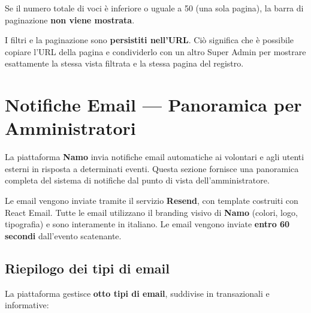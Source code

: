 \documentclass[a4paper,11pt,oneside]{book}
\newcommand{\namo}{\textbf{Namo}}
\begin{document}
Se il numero totale di voci \`e inferiore o uguale a 50 (una sola pagina), la barra di paginazione \textbf{non viene mostrata}.

\begin{tipbox}
I filtri e la paginazione sono \textbf{persistiti nell'URL}. Ci\`o significa che \`e possibile copiare l'URL della pagina e condividerlo con un altro Super Admin per mostrare esattamente la stessa vista filtrata e la stessa pagina del registro.
\end{tipbox}

\section{Notifiche Email --- Panoramica per Amministratori}
\label{sec:notifiche-panoramica}

La piattaforma \namo{} invia notifiche email automatiche ai volontari e agli utenti esterni in risposta a determinati eventi. Questa sezione fornisce una panoramica completa del sistema di notifiche dal punto di vista dell'amministratore.

\begin{infobox}
Le email vengono inviate tramite il servizio \textbf{Resend}, con template costruiti con React Email. Tutte le email utilizzano il branding visivo di \namo{} (colori, logo, tipografia) e sono interamente in italiano. Le email vengono inviate \textbf{entro 60 secondi} dall'evento scatenante.
\end{infobox}

\subsection{Riepilogo dei tipi di email}

La piattaforma gestisce \textbf{otto tipi di email}, suddivise in transazionali e informative:
\end{document}
